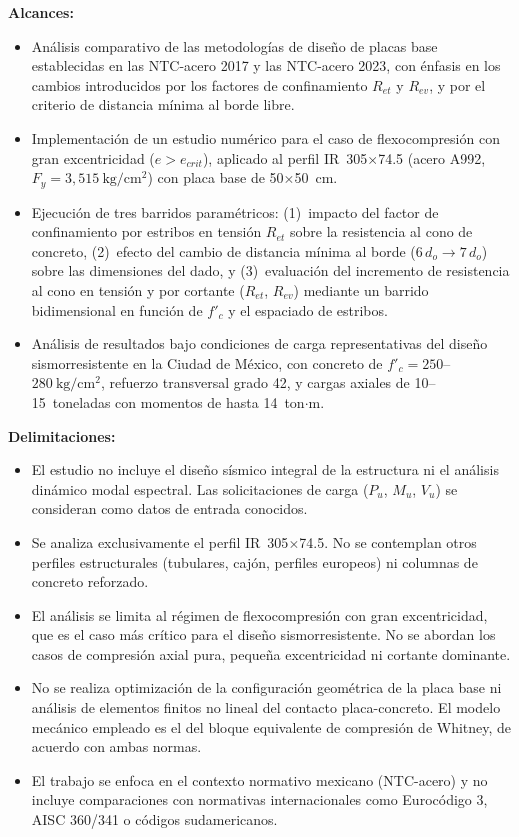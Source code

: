 \textbf{Alcances:}
\begin{itemize}
  \item Análisis comparativo de las metodologías de diseño de placas base establecidas en las
    NTC-acero 2017 y las NTC-acero 2023, con énfasis en los cambios introducidos por los factores de
    confinamiento $R_{et}$ y $R_{ev}$, y por el criterio de distancia mínima al borde libre.
  \item Implementación de un estudio numérico para el caso de flexocompresión con gran
    excentricidad ($e > e_{crit}$), aplicado al perfil IR~305$\times$74.5 (acero A992,
    $F_y = 3{,}515\ \mathrm{kg/cm^2}$) con placa base de 50$\times$50~cm.
  \item Ejecución de tres barridos paramétricos: (1)~impacto del factor de confinamiento por
    estribos en tensión $R_{et}$ sobre la resistencia al cono de concreto, (2)~efecto del cambio
    de distancia mínima al borde ($6\,d_o \to 7\,d_o$) sobre las dimensiones del dado, y
    (3)~evaluación del incremento de resistencia al cono en tensión y por cortante ($R_{et}$,
    $R_{ev}$) mediante un barrido bidimensional en función de $f'_c$ y el espaciado de
    estribos.
  \item Análisis de resultados bajo condiciones de carga representativas del diseño
    sismorresistente en la Ciudad de México, con concreto de $f'_c = 250$--$280\
    \mathrm{kg/cm^2}$, refuerzo transversal grado 42, y cargas axiales de 10--15~toneladas con
    momentos de hasta 14~ton$\cdot$m.
\end{itemize}

\textbf{Delimitaciones:}
\begin{itemize}
  \item El estudio no incluye el diseño sísmico integral de la estructura ni el análisis dinámico
    modal espectral. Las solicitaciones de carga ($P_u$, $M_u$, $V_u$) se consideran como datos de
    entrada conocidos.
  \item Se analiza exclusivamente el perfil IR~305$\times$74.5. No se contemplan otros perfiles
    estructurales (tubulares, cajón, perfiles europeos) ni columnas de concreto reforzado.
  \item El análisis se limita al régimen de flexocompresión con gran excentricidad, que es el caso
    más crítico para el diseño sismorresistente. No se abordan los casos de compresión axial pura,
    pequeña excentricidad ni cortante dominante.
  \item No se realiza optimización de la configuración geométrica de la placa base ni análisis de
    elementos finitos no lineal del contacto placa-concreto. El modelo mecánico empleado es el del
    bloque equivalente de compresión de Whitney, de acuerdo con ambas normas.
  \item El trabajo se enfoca en el contexto normativo mexicano (NTC-acero) y no incluye comparaciones
    con normativas internacionales como Eurocódigo 3, AISC 360/341 o códigos sudamericanos.
\end{itemize}

